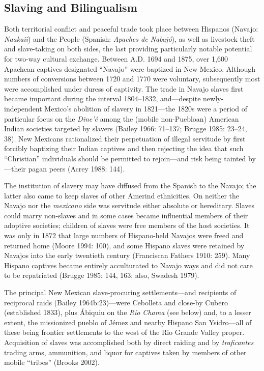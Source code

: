 \subsection{Slaving and Bilingualism}
Both territorial conflict and peaceful trade took place between Hispanos (Navajo: \textit{Naakaii}) and the People (Spanish: \textit{Apaches de Nabajó}), as well as livestock theft and slave-taking on both sides, the last providing particularly notable potential for two-way cultural exchange.  Between A.D. 1694 and 1875, over 1,600 Apachean captives designated “Navajo” were baptized in New Mexico.  Although numbers of conversions between 1720 and 1770 were voluntary, subsequently most were accomplished under duress of captivity.  The trade in Navajo slaves first became important during the interval 1804–1832, and—despite newly-independent Mexico’s abolition of slavery in 1821—the 1820s were a period of particular focus on the \textit{Dine’é} among the (mobile non-Puebloan) American Indian societies targeted by slavers (Bailey 1966: 71–137; Brugge 1985: 23–24, 38).  New Mexicans rationalized their perpetuation of illegal servitude by first forcibly baptizing their Indian captives and then rejecting the idea that such “Christian” individuals should be permitted to rejoin—and risk being tainted by—their pagan peers (Acrey 1988: 144).

The institution of slavery may have diffused from the Spanish to the Navajo; the latter also came to keep slaves of other Amerind ethnicities.  On neither the Navajo nor the \textit{mexicano }side was servitude either absolute or hereditary.  Slaves could marry non-slaves and in some cases became influential members of their adoptive societies; children of slaves were free members of the host societies.  It was only in 1872 that large numbers of Hispano-held Navajos were freed and returned home (Moore 1994: 100), and some Hispano slaves were retained by Navajos into the early twentieth century (Franciscan Fathers 1910: 259).  Many Hispano captives became entirely acculturated to Navajo ways and did not care to be repatriated (Brugge 1985: 144, 163; also, Swadesh 1979).

The principal New Mexican slave-procuring settlements—and recipients of reciprocal raids (Bailey 1964b:23)—were Cebolleta and close-by Cubero (established 1833), plus Ábiquiu on the \textit{Río Chama} (see below) and, to a lesser extent, the missionized pueblo of Jémez and nearby Hispano San Ysidro—all of these being frontier settlements to the west of the Rio Grande Valley proper.  Acquisition of slaves was accomplished both by direct raiding and by \textit{traficantes} trading arms, ammunition, and liquor for captives taken by members of other mobile “tribes” (Brooks 2002).

